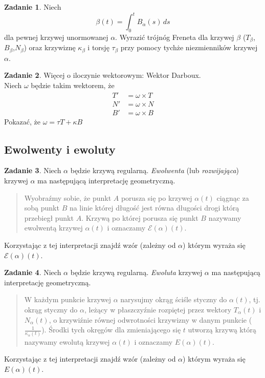 \documentclass[a4paper,11pt]{article}
\theoremstyle{definition}\newtheorem{exercise}{Zadanie}
\theoremstyle{definition}\newtheorem{remark}{Uwaga}
\begin{document}
\begin{exercise}
Niech \[\beta(t)=\int_0^t B_\alpha (s)\,ds\] dla pewnej krzywej unormowanej 
$\alpha$. Wyrazić trójnóg Freneta dla krzywej $\beta$ 
($T_\beta$,$B_\beta$,$N_\beta$) oraz krzywiznę $\kappa_\beta$ i torsję 
$\tau_\beta$ przy pomocy tychże niezmienników krzywej $\alpha$.
\end{exercise}


\begin{exercise}
Więcej o iloczynie wektorowym: Wektor Darboux.\\
Niech $\omega$ będzie takim wektorem, że 
\begin{align*}
T'&=\omega\times T\\
N'&=\omega\times N\\
B'&=\omega\times B
\end{align*}
Pokazać, że $\omega=\tau T+\kappa B$

\end{exercise}


\subsection{Ewolwenty i ewoluty}
\begin{exercise}
Niech $\alpha$ będzie krzywą regularną. \textit{Ewolwenta} (lub 
\textit{rozwijająca}) krzywej $\alpha$ ma następującą interpretację 
geometryczną.

\begin{quote}
Wyobraźmy sobie, że punkt $A$ porusza się po krzywej $\alpha(t)$ ciągnąc za 
sobą punkt $B$ na linie kt\'orej długość jest r\'owna długości drogi kt\'orą 
przebiegł punkt $A$. Krzywą po kt\'orej porusza się punkt $B$ nazywamy 
ewolwentą krzywej $\alpha(t)$ i oznaczamy $\mathcal{E}(\alpha)(t)$.
\end{quote}

Korzystając z tej interpretacji znajdź wz\'or (zależny od $\alpha$) kt\'orym 
wyraża się $\mathcal{E}(\alpha)(t)$.
\end{exercise}

\begin{exercise}
Niech $\alpha$ będzie krzywą regularną. \textit{Ewoluta} krzywej $\alpha$ ma 
następującą interpretację geometryczną.

\begin{quote}
W każdym punkcie krzywej $\alpha$ narysujmy okrąg ściśle styczny do 
$\alpha(t)$, tj. okrąg styczny do $\alpha$, leżący w płaszczyźnie rozpiętej 
przez wektory $T_\alpha(t)$ i $N_\alpha(t)$, o krzywiźnie 
r\'ownej odwrotności krzywizny w danym punkcie ($\frac{1}{\kappa_{\alpha} 
(t)}$). Środki tych okręg\'ow dla zmieniającego się $t$ utworzą krzywą
kt\'orą nazywamy ewolutą krzywej $\alpha(t)$ i oznaczamy $E(\alpha)(t)$.
\end{quote}

Korzystając z tej interpretacji znajdź wz\'or (zależny od $\alpha$) kt\'orym 
wyraża się $E(\alpha)(t)$.
\end{exercise}
\end{document}
